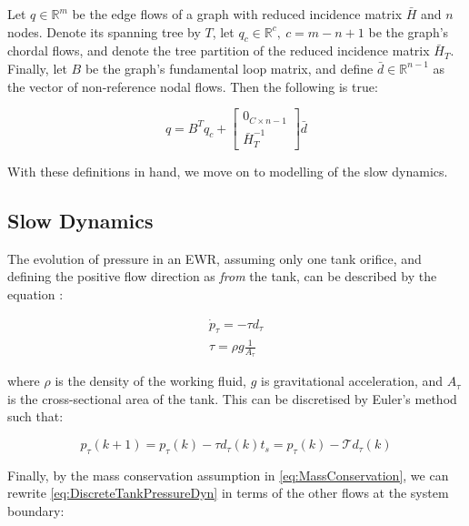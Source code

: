 \newpage

\begin{lemma}\label{lem:EdgeFlowDecomposition}
	Let $q \in \mathbb{R}^m$ be the edge flows of a graph with reduced incidence matrix $\bar{H}$ and $n$ nodes. Denote its spanning tree by $T$, let $q_c \in \mathbb{R}^c, \ c = m-n+1$ be the graph's chordal flows, and denote the tree partition of the reduced incidence matrix $\bar{H}_T$. Finally, let $B$ be the graph's fundamental loop matrix, and define $\bar{d} \in \mathbb{R}^{n-1}$ as the vector of non-reference nodal flows. Then the following is true:
	
	\begin{equation}\label{eq:EdgeFlowDecomposition}
		q = B^T q_c +
		\begin{bmatrix}
			0_{C \times n-1} \\ \bar{H}_T^{-1} 
		\end{bmatrix}
		\bar{d}
	\end{equation}
\end{lemma}

With these definitions in hand, we move on to modelling of the slow dynamics.

\subsection{Slow Dynamics}\label{subsec:SlowDynamics}

The evolution of pressure in an EWR, assuming only one tank orifice, and defining the positive flow direction as \textit{from} the tank, can be described by the equation \cite{Jensen,Suresh2009}:

\begin{gather}\label{eq:TankPressureDyn}
	\dot{p}_\tau = -\tau d_\tau
	\\ \tau = \rho g \frac{1}{A_\tau}
\end{gather}

where $\rho$ is the density of the working fluid, $g$ is gravitational acceleration, and $A_\tau$ is the cross-sectional area of the tank. This can be discretised by Euler's method such that:

\begin{equation}\label{eq:DiscreteTankPressureDyn}
	p_\tau(k+1) = p_\tau(k) - \tau d_\tau(k)t_s =  p_\tau(k) - \mathcal{T} d_\tau(k)
\end{equation}

Finally, by the mass conservation assumption in \cref{eq:MassConservation}, we can rewrite \cref{eq:DiscreteTankPressureDyn} in terms of the other flows at the system boundary:

